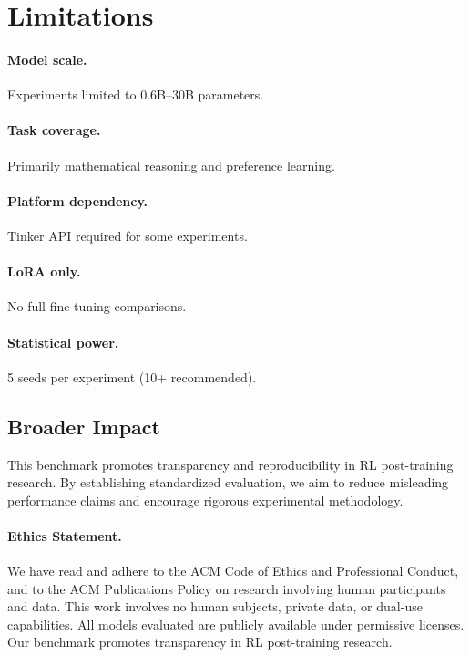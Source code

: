 \documentclass[manuscript,review,anonymous]{acmart}
\begin{document}
\section{Limitations}
\label{sec:limitations}

\paragraph{Model scale.} Experiments limited to 0.6B--30B parameters.
\paragraph{Task coverage.} Primarily mathematical reasoning and preference learning.
\paragraph{Platform dependency.} Tinker API required for some experiments.
\paragraph{LoRA only.} No full fine-tuning comparisons.
\paragraph{Statistical power.} 5 seeds per experiment (10+ recommended).

\subsection{Broader Impact}
\label{sec:impact}

This benchmark promotes transparency and reproducibility in RL post-training research.
By establishing standardized evaluation, we aim to reduce misleading performance claims
and encourage rigorous experimental methodology.

\paragraph{Ethics Statement.}
We have read and adhere to the ACM Code of Ethics and Professional Conduct, and to the ACM Publications Policy on research involving human participants and data. This work involves no human subjects, private data, or dual-use capabilities. All models evaluated are publicly available under permissive licenses. Our benchmark promotes transparency in RL post-training research.
\end{document}
